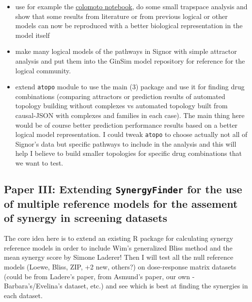 \documentclass[12pt,]{book}
\providecommand{\tightlist}{%
  \setlength{\itemsep}{0pt}\setlength{\parskip}{0pt}}
\begin{document}
\begin{enumerate}
  \begin{itemize}
  \tightlist
  \item
    use for example the \href{https://github.com/colomoto/colomoto-docker}{colomoto notebook}, do some small trapspace analysis and show that some results from literature or from previous logical or other models can now be reproduced with a better biological representation in the model itself
  \item
    make many logical models of the pathways in Signor with simple attractor analysis and put them into the GinSim model repository for reference for the logical community.
  \item
    extend \texttt{atopo} module to use the main (3) package and use it for finding drug combinations (comparing attractors or prediction results of automated topology building without complexes vs automated topology built from causal-JSON with complexes and families in each case).
    The main thing here would be of course better prediction performance results based on a better logical model representation.
    I could tweak \texttt{atopo} to choose actually not all of Signor's data but specific pathways to include in the analysis and this will help I believe to build smaller topologies for specific drug combinations that we want to test.
  \end{itemize}
\end{enumerate}

\hypertarget{paper-iii-extending-synergyfinder-for-the-use-of-multiple-reference-models-for-the-assement-of-synergy-in-screening-datasets}{%
\subsection{\texorpdfstring{Paper III: Extending \texttt{SynergyFinder} for the use of multiple reference models for the assement of synergy in screening datasets}{Paper III: Extending SynergyFinder for the use of multiple reference models for the assement of synergy in screening datasets}}\label{paper-iii-extending-synergyfinder-for-the-use-of-multiple-reference-models-for-the-assement-of-synergy-in-screening-datasets}}

The core idea here is to extend an existing R package for calculating synergy
reference models in order to include Wim's generalized Bliss method and the mean synergy score by Simone Laderer! Then I will test all the null reference models (Loewe, Bliss, ZIP, +2 new, others?) on dose-response matrix datasets (could be from Ladere's paper, from Asmund's paper,
our own - Barbara's/Evelina's dataset, etc.) and see which is best at finding the
synergies in each dataset.
\end{document}
